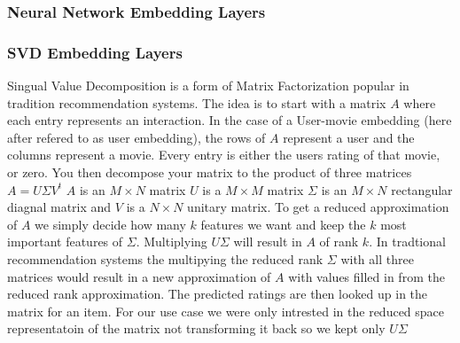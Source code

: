 \subsubsection{Neural Network Embedding Layers}

\subsubsection{SVD Embedding Layers}
Singual Value Decomposition is a form of Matrix Factorization popular in tradition recommendation systems. The idea is to start with a matrix $A$ where each entry represents an interaction. In the case of a User-movie embedding (here after refered to as user embedding), the rows of $A$ represent a user and the columns represent a movie. Every entry is either the users rating of that movie, or zero. You then decompose your matrix to the product of three matrices $A = U\Sigma V^t$ $A$ is an $M \times N$ matrix $U$ is a $M \times M$ matrix $\Sigma$ is an $M \times N$ rectangular diagnal matrix and $V$ is a $N \times N$ unitary matrix. To get a reduced approximation of $A$ we simply decide how many $k$ features we want and keep the $k$ most important features of $\Sigma$. Multiplying $U\Sigma$ will result in $A$ of rank $k$. In tradtional recommendation systems the multipying the reduced rank $\Sigma$ with all three matrices would result in a new approximation of $A$ with values filled in from the reduced rank approximation. The predicted ratings are then looked up in the matrix for an item. For our use case we were only intrested in the reduced space representatoin of the matrix not transforming it back so we kept only $U\Sigma$